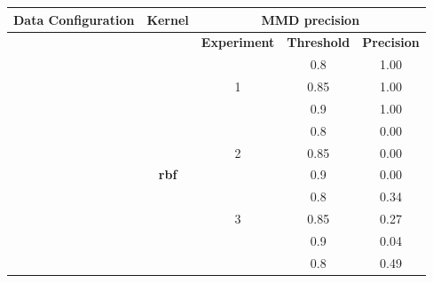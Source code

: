 \documentclass{mpaper}
\begin{document}
\begin{table}[]
\centering
\begin{tabular}{|l|c|ccc|}
\hline
\textbf{Data   Configuration}               & \textbf{Kernel} & \multicolumn{3}{c|}{\textbf{MMD precision}}                                                                   \\ \hline
                                            &                 & \multicolumn{1}{c|}{\textbf{Experiment}}       & \multicolumn{1}{c|}{\textbf{Threshold}} & \textbf{Precision} \\ \cline{3-5} 
                                            &                 & \multicolumn{1}{c|}{}                          & \multicolumn{1}{c|}{0.8}                & 1.00               \\
                                            &                 & \multicolumn{1}{c|}{1}                         & \multicolumn{1}{c|}{0.85}               & 1.00               \\
                                            &                 & \multicolumn{1}{c|}{}                          & \multicolumn{1}{c|}{0.9}                & 1.00               \\ \cline{3-5} 
                                            &                 & \multicolumn{1}{c|}{}                          & \multicolumn{1}{c|}{0.8}                & 0.00               \\
                                            & \textbf{}       & \multicolumn{1}{c|}{2}                         & \multicolumn{1}{c|}{0.85}               & 0.00               \\
                                            & \textbf{rbf}    & \multicolumn{1}{c|}{}                          & \multicolumn{1}{c|}{0.9}                & 0.00               \\ \cline{3-5} 
                                            &                 & \multicolumn{1}{c|}{}                          & \multicolumn{1}{c|}{0.8}                & 0.34               \\
                                            &                 & \multicolumn{1}{c|}{3}                         & \multicolumn{1}{c|}{0.85}               & 0.27               \\
                                            &                 & \multicolumn{1}{c|}{}                          & \multicolumn{1}{c|}{0.9}                & 0.04               \\ \cline{3-5} 
                                            &                 & \multicolumn{1}{l|}{}                          & \multicolumn{1}{c|}{0.8}                & 0.49               \\

\end{tabular}
\end{table}
\end{document}
